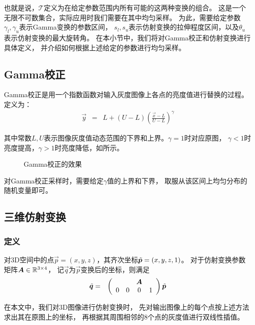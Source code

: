 也就是说，$\mathcal{T}$定义为在给定参数范围内所有可能的这两种变换的组合。
这是一个无限不可数集合，实际应用时我们需要在其中均匀采样。
为此，需要给定参数$\gamma_l, \gamma_u$表示Gamma变换的参数区间，
$s_l, s_u$表示仿射变换的拉伸程度区间，以及$\theta_u$表示仿射变换的最大旋转角。
在本小节中，我们将对Gamma校正和仿射变换进行具体定义，
并介绍如何根据上述给定的参数进行均匀采样。

\subsection{Gamma校正}
Gamma校正是用一个指数函数对输入灰度图像上各点的亮度值进行替换的过程。
定义为：
\begin{eqnarray}
    \vec{y} &=& L + (U-L)\left(\frac{\vec{x}-L}{U-L}\right)^\gamma
\end{eqnarray}

其中常数$L, U$表示图像灰度值动态范围的下界和上界。$\gamma=1$时对应原图，
$\gamma < 1$时亮度提高，$\gamma > 1$时亮度降低，如所示。

\begin{figure}[H]
    \caption{Gamma校正的效果}
    \label{fig:cnn:aug:gamma}
\end{figure}

对Gamma校正采样时，需要给定$\gamma$值的上界和下界，
取服从该区间上均匀分布的随机变量即可。

\subsection{三维仿射变换}

\subsubsection{定义}
对3D空间中的点$\vec{p} = (x, y, z)$，其齐次坐标$\tilde{\boldsymbol{p}}=(x, y, z, 1)$。
对于仿射变换参数矩阵$\boldsymbol{A} \in \mathbb{R}^{3\times 4}$，
记$\vec{q}$为$\vec{p}$变换后的坐标，则满足
\begin{eqnarray}
    \tilde{\boldsymbol{q}} &=& \left(\begin{array}{cccc}
        & & \boldsymbol{A} & \\
        0 & 0 & 0 & 1
    \end{array}\right)\tilde{\boldsymbol{p}}
\end{eqnarray}

在本文中，我们对3D图像进行仿射变换时，
先对输出图像上的每个点按上述方法求出其在原图上的坐标，
再根据其周围相邻的$8$个点的灰度值进行双线性插值。

